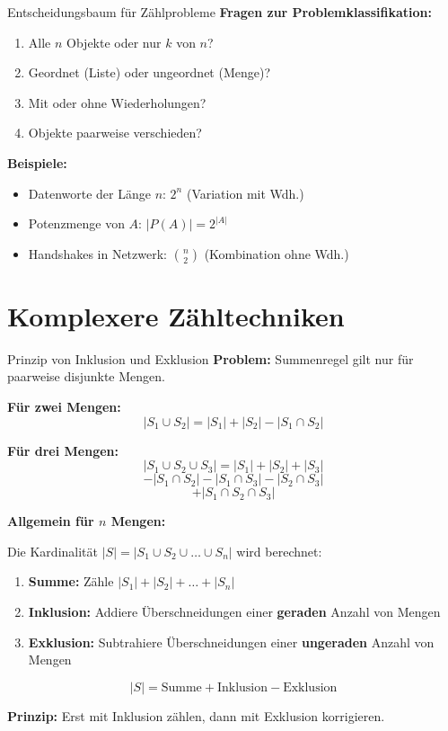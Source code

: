\documentclass[a4paper, fontsize=7pt]{scrartcl}
\begin{document}
\begin{subbox}{Entscheidungsbaum für Zählprobleme}
\textbf{Fragen zur Problemklassifikation:}
\begin{enumerate}
    \item Alle $n$ Objekte oder nur $k$ von $n$?
    \item Geordnet (Liste) oder ungeordnet (Menge)?
    \item Mit oder ohne Wiederholungen?
    \item Objekte paarweise verschieden?
\end{enumerate}

\textbf{Beispiele:}
\begin{itemize}
    \item Datenworte der Länge $n$: $2^n$ (Variation mit Wdh.)
    \item Potenzmenge von $A$: $|P(A)| = 2^{|A|}$
    \item Handshakes in Netzwerk: $\binom{n}{2}$ (Kombination ohne Wdh.)
\end{itemize}
\end{subbox}

\section{Komplexere Zähltechniken}

\begin{mainbox}{Prinzip von Inklusion und Exklusion}
\textbf{Problem:} Summenregel gilt nur für paarweise disjunkte Mengen.

\textbf{Für zwei Mengen:}
$$|S_1 \cup S_2| = |S_1| + |S_2| - |S_1 \cap S_2|$$

\textbf{Für drei Mengen:}
$$|S_1 \cup S_2 \cup S_3| = |S_1| + |S_2| + |S_3|$$
$$- |S_1 \cap S_2| - |S_1 \cap S_3| - |S_2 \cap S_3|$$
$$+ |S_1 \cap S_2 \cap S_3|$$

\textbf{Allgemein für $n$ Mengen:}

Die Kardinalität $|S| = |S_1 \cup S_2 \cup \ldots \cup S_n|$ wird berechnet:
\begin{enumerate}
    \item \textbf{Summe:} Zähle $|S_1| + |S_2| + \ldots + |S_n|$
    \item \textbf{Inklusion:} Addiere Überschneidungen einer \textbf{geraden} Anzahl von Mengen
    \item \textbf{Exklusion:} Subtrahiere Überschneidungen einer \textbf{ungeraden} Anzahl von Mengen
\end{enumerate}

$$|S| = \text{Summe} + \text{Inklusion} - \text{Exklusion}$$

\textbf{Prinzip:} Erst mit Inklusion zählen, dann mit Exklusion korrigieren.
\end{mainbox}
\end{document}
